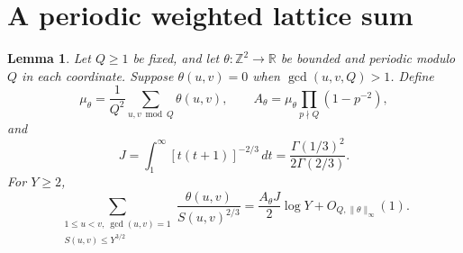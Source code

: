 \documentclass[11pt,a4paper]{article}
\numberwithin{equation}{section}
\newtheorem{lemma}[theorem]{Lemma}
\theoremstyle{remark}
\newcommand{\Z}{\mathbb Z}
\newcommand{\R}{\mathbb R}
\begin{document}
\section{A periodic weighted lattice sum}\label{sec:lattice}
\begin{lemma}\label{lem:lattice}
Let $Q\ge1$ be fixed, and let $\theta:\Z^2\to\R$ be bounded and periodic modulo $Q$ in each coordinate. Suppose $\theta(u,v)=0$ when $\gcd(u,v,Q)>1$. Define
\begin{equation}\label{eq:Atheta}
\mu_\theta=\frac1{Q^2}\sum_{u,v\bmod Q}\theta(u,v),\qquad
A_\theta=\mu_\theta\prod_{p\nmid Q}(1-p^{-2}),
\end{equation}
and
\begin{equation}\label{eq:J}
J=\int_1^\infty[t(t+1)]^{-2/3}\,dt
=\frac{\Gamma(1/3)^2}{2\Gamma(2/3)}.
\end{equation}
For $Y\ge2$,
\begin{equation}\label{eq:lattice}
\sum_{\substack{1\le u<v,\ \gcd(u,v)=1\\S(u,v)\le Y^{3/2}}}
\frac{\theta(u,v)}{S(u,v)^{2/3}}
=\frac{A_\theta J}{2}\log Y+O_{Q,\|\theta\|_\infty}(1).
\end{equation}
\end{lemma}
\end{document}
